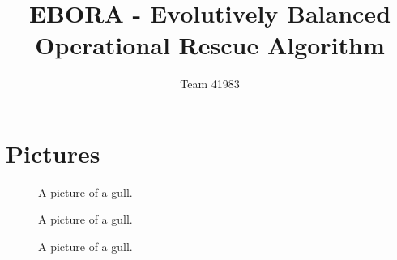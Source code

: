 \documentclass[12pt]{article}
\title{EBORA - Evolutively Balanced Operational Rescue Algorithm}
\author{Team 41983}
\date{}                                           %
\begin{document}
\setlength{\parindent}{0cm}

\section{Pictures}

\begin{figure}[h!]
	\begin{center}
	\end{center}
	\caption{A picture of a gull.}
\end{figure}

\begin{figure}[h!]
	\begin{center}
	\end{center}
	\caption{A picture of a gull.}
\end{figure}

\begin{figure}[h!]
	\begin{center}
	\end{center}
	\caption{A picture of a gull.}
\end{figure}
\end{document}
